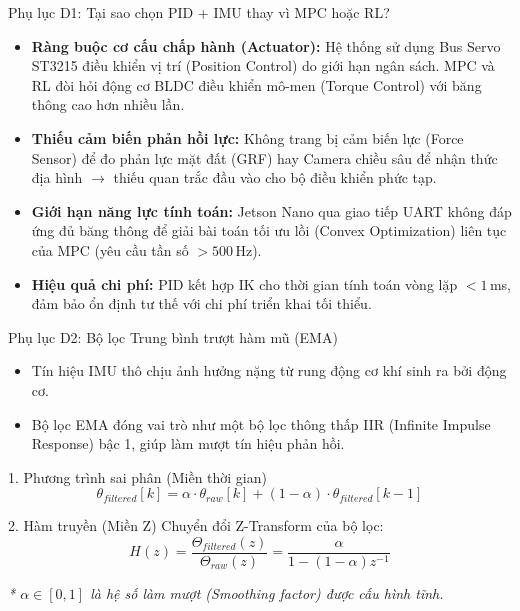 \documentclass[10pt,aspectratio=169]{beamer}
\begin{document}
\begin{frame}{Phụ lục D1: Tại sao chọn PID + IMU thay vì MPC hoặc RL?}
  \begin{itemize}
      \item \textbf{Ràng buộc cơ cấu chấp hành (Actuator):} Hệ thống sử dụng Bus Servo ST3215 điều khiển vị trí (Position Control) do giới hạn ngân sách. MPC và RL đòi hỏi động cơ BLDC điều khiển mô-men (Torque Control) với băng thông cao hơn nhiều lần.
      \item \textbf{Thiếu cảm biến phản hồi lực:} Không trang bị cảm biến lực (Force Sensor) để đo phản lực mặt đất (GRF) hay Camera chiều sâu để nhận thức địa hình $\rightarrow$ thiếu quan trắc đầu vào cho bộ điều khiển phức tạp.
      \item \textbf{Giới hạn năng lực tính toán:} Jetson Nano qua giao tiếp UART không đáp ứng đủ băng thông để giải bài toán tối ưu lồi (Convex Optimization) liên tục của MPC (yêu cầu tần số $> 500\,$Hz).
      \item \textbf{Hiệu quả chi phí:} PID kết hợp IK cho thời gian tính toán vòng lặp $<1\,$ms, đảm bảo ổn định tư thế với chi phí triển khai tối thiểu.
  \end{itemize}
\end{frame}

\begin{frame}{Phụ lục D2: Bộ lọc Trung bình trượt hàm mũ (EMA)}
  \begin{itemize}
      \item Tín hiệu IMU thô chịu ảnh hưởng nặng từ rung động cơ khí sinh ra bởi động cơ.
      \item Bộ lọc EMA đóng vai trò như một bộ lọc thông thấp IIR (Infinite Impulse Response) bậc 1, giúp làm mượt tín hiệu phản hồi.
  \end{itemize}
  \vspace{0.2cm}
  \begin{block}{1. Phương trình sai phân (Miền thời gian)}
      \begin{equation*}
          \theta_{filtered}[k] = \alpha \cdot \theta_{raw}[k] + (1 - \alpha) \cdot \theta_{filtered}[k-1]
      \end{equation*}
  \end{block}
  \vspace{0.2cm}
  \begin{block}{2. Hàm truyền (Miền Z)}
      Chuyển đổi Z-Transform của bộ lọc:
      \begin{equation*}
          H(z) = \frac{\Theta_{filtered}(z)}{\Theta_{raw}(z)} = \frac{\alpha}{1 - (1-\alpha)z^{-1}}
      \end{equation*}
  \end{block}
  {\small \textit{* $\alpha \in [0, 1]$ là hệ số làm mượt (Smoothing factor) được cấu hình tĩnh.}}
\end{frame}
\end{document}

